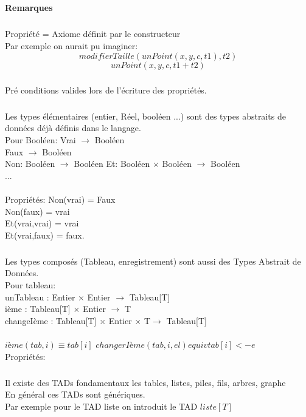 		\subsection{}		
			
			\paragraph{Remarques}
				\subparagraph{}
				Propriété = Axiome définit par le constructeur \\ 
				Par exemple on aurait pu imaginer:\\
				$$modifierTaille(unPoint(x,y,c,t1),t2)$$
				$$unPoint(x,y,c,t1+t2)$$
				\subparagraph{}
					Pré conditions valides lors de l'écriture des propriétés.
				\subparagraph{}
					Les types élémentaires (entier, Réel, booléen ...) sont des types abstraits de données déjà définis dans le langage. \\
					Pour Booléen: Vrai $\rightarrow$ Booléen \\
									Faux $\rightarrow$ Booléen \\
									Non: Booléen $\rightarrow$ Booléen
									Et: Booléen $\times$ Booléen $\rightarrow$ Booléen \\ ...\\ \\
					Propriétés: Non(vrai) = Faux\\
								Non(faux) = vrai\\
								Et(vrai,vrai) = vrai\\
								Et(vrai,faux) = faux.\\
				\subparagraph{}
					Les types composés (Tableau, enregistrement) sont aussi des Types Abstrait de Données.	\\
					Pour tableau:\\
						unTableau : Entier $\times$ Entier $\rightarrow$ Tableau[T]\\
						ième : Tableau[T] $\times$ Entier $\rightarrow$ T\\
						changeIème : Tableau[T] $\times$ Entier $\times$ T$ \rightarrow$ Tableau[T]\\ \\
						$ième(tab, i) \equiv tab[i]$
						$changerIème(tab, i, el) equiv tab[i]<-e$\\
					Propriétés:\\
			
				\subparagraph{}
					Il existe des TADs fondamentaux les tables, listes, piles, fils, arbres, graphe\\
					En général ces TADs sont génériques.\\
					Par exemple pour le TAD liste on introduit le TAD $liste[T]$

